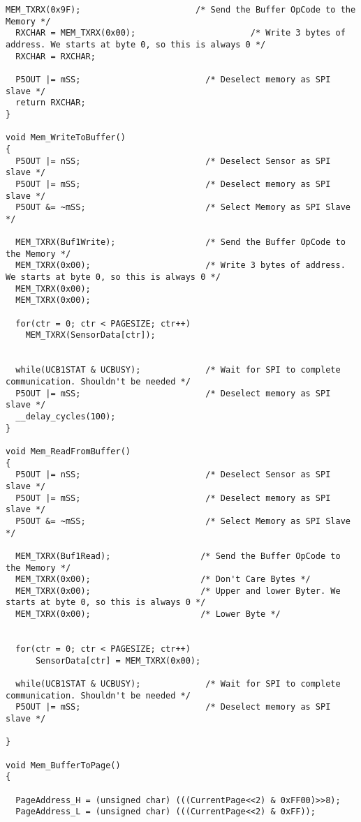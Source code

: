 \begin{lstlisting}[caption=Main.c,label=Code4]
  MEM_TXRX(0x9F);                       /* Send the Buffer OpCode to the Memory */
  RXCHAR = MEM_TXRX(0x00);                       /* Write 3 bytes of address. We starts at byte 0, so this is always 0 */
  RXCHAR = RXCHAR;
  
  P5OUT |= mSS;                         /* Deselect memory as SPI slave */ 
  return RXCHAR;
}

void Mem_WriteToBuffer()
{
  P5OUT |= nSS;                         /* Deselect Sensor as SPI slave */ 
  P5OUT |= mSS;                         /* Deselect memory as SPI slave */ 
  P5OUT &= ~mSS;                        /* Select Memory as SPI Slave */

  MEM_TXRX(Buf1Write);                  /* Send the Buffer OpCode to the Memory */
  MEM_TXRX(0x00);                       /* Write 3 bytes of address. We starts at byte 0, so this is always 0 */
  MEM_TXRX(0x00);
  MEM_TXRX(0x00);
  
  for(ctr = 0; ctr < PAGESIZE; ctr++)
    MEM_TXRX(SensorData[ctr]);

  
  while(UCB1STAT & UCBUSY);             /* Wait for SPI to complete communication. Shouldn't be needed */
  P5OUT |= mSS;                         /* Deselect memory as SPI slave */ 
  __delay_cycles(100);
}

void Mem_ReadFromBuffer()
{
  P5OUT |= nSS;                         /* Deselect Sensor as SPI slave */ 
  P5OUT |= mSS;                         /* Deselect memory as SPI slave */ 
  P5OUT &= ~mSS;                        /* Select Memory as SPI Slave */
  
  MEM_TXRX(Buf1Read);                  /* Send the Buffer OpCode to the Memory */
  MEM_TXRX(0x00);                      /* Don't Care Bytes */
  MEM_TXRX(0x00);                      /* Upper and lower Byter. We starts at byte 0, so this is always 0 */
  MEM_TXRX(0x00);                      /* Lower Byte */
  
  
  for(ctr = 0; ctr < PAGESIZE; ctr++)
      SensorData[ctr] = MEM_TXRX(0x00);

  while(UCB1STAT & UCBUSY);             /* Wait for SPI to complete communication. Shouldn't be needed */
  P5OUT |= mSS;                         /* Deselect memory as SPI slave */ 
  
}

void Mem_BufferToPage()
{
  
  PageAddress_H = (unsigned char) (((CurrentPage<<2) & 0xFF00)>>8);
  PageAddress_L = (unsigned char) (((CurrentPage<<2) & 0xFF));
  

\end{lstlisting}
